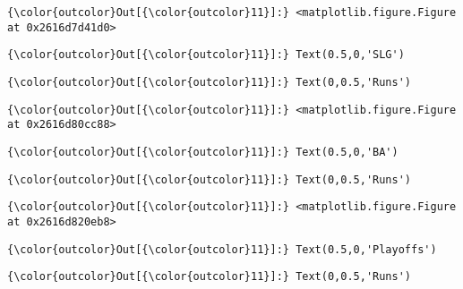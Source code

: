 \documentclass[11pt]{article}
\begin{document}
\begin{Verbatim}[commandchars=\\\{\}]
{\color{outcolor}Out[{\color{outcolor}11}]:} <matplotlib.figure.Figure at 0x2616d7d41d0>
\end{Verbatim}
            
\begin{Verbatim}[commandchars=\\\{\}]
{\color{outcolor}Out[{\color{outcolor}11}]:} Text(0.5,0,'SLG')
\end{Verbatim}
            
\begin{Verbatim}[commandchars=\\\{\}]
{\color{outcolor}Out[{\color{outcolor}11}]:} Text(0,0.5,'Runs')
\end{Verbatim}
            
\begin{Verbatim}[commandchars=\\\{\}]
{\color{outcolor}Out[{\color{outcolor}11}]:} <matplotlib.figure.Figure at 0x2616d80cc88>
\end{Verbatim}
            
\begin{Verbatim}[commandchars=\\\{\}]
{\color{outcolor}Out[{\color{outcolor}11}]:} Text(0.5,0,'BA')
\end{Verbatim}
            
\begin{Verbatim}[commandchars=\\\{\}]
{\color{outcolor}Out[{\color{outcolor}11}]:} Text(0,0.5,'Runs')
\end{Verbatim}
            
\begin{Verbatim}[commandchars=\\\{\}]
{\color{outcolor}Out[{\color{outcolor}11}]:} <matplotlib.figure.Figure at 0x2616d820eb8>
\end{Verbatim}
            
\begin{Verbatim}[commandchars=\\\{\}]
{\color{outcolor}Out[{\color{outcolor}11}]:} Text(0.5,0,'Playoffs')
\end{Verbatim}
            
\begin{Verbatim}[commandchars=\\\{\}]
{\color{outcolor}Out[{\color{outcolor}11}]:} Text(0,0.5,'Runs')
\end{Verbatim}
            
\end{document}
